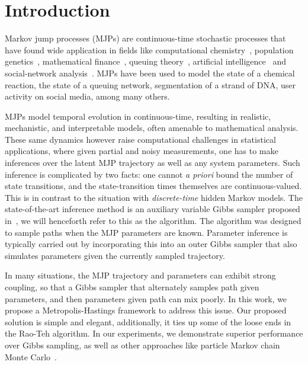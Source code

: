 \section{Introduction}
\label{sec:intro}
Markov jump processes (MJPs) are continuous-time stochastic processes that
have found wide application in fields like computational chemistry~\cite{gillespie97}, 
population genetics~\cite{FearnSher2006}, mathematical finance~\cite{Elliott06}, 
queuing theory~\cite{Breuer2003}, artificial intelligence~\cite{XuShe10} and
social-network analysis~\cite{pan2016markov}. %
MJPs have been used to model the state of a chemical reaction, the state 
of a queuing network, segmentation of a strand of DNA, user activity on social 
media, among many others.

MJPs model temporal evolution in continuous-time, resulting in 
realistic, mechanistic, and interpretable models, often amenable to 
mathematical analysis. These same dynamics however raise computational
challenges in statistical applications, where given partial and noisy 
measurements, one has to make inferences over the latent MJP 
trajectory as well as any system parameters. Such
inference is complicated by two facts: one cannot {\em a priori} 
bound the number of state transitions, and the state-transition times themselves
are continuous-valued. This is in contrast to the situation with
{\em discrete-time} hidden Markov models. %
The state-of-the-art inference method is an auxiliary variable Gibbs sampler proposed 
in~\cite{RaoTeh13}, we will henceforth refer to this as the {\algname} 
algorithm. The {\algname} algorithm was designed to sample paths when the MJP parameters
are known. Parameter inference is typically carried out by 
incorporating this into an outer Gibbs sampler that also simulates
parameters given the currently sampled trajectory. 

In many situations, the MJP trajectory and parameters can exhibit 
strong coupling, so that a Gibbs sampler that alternately samples path given
parameters, and then parameters given path can mix poorly.  
In this work, we propose a Metropolis-Hastings framework to address
this issue. Our proposed solution is simple and elegant, additionally,
it ties up some of the loose ends in the Rao-Teh algorithm.
In our experiments, we demonstrate superior 
performance over Gibbs sampling, as well as other approaches like 
particle Markov chain Monte Carlo~\cite{Andrieu10}.

